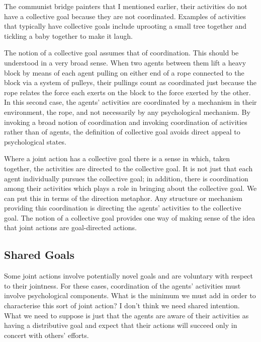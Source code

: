 \documentclass[12pt,a4paper]{extarticle}
\begin{document}
The communist bridge painters that I mentioned earlier, their activities do not have a collective goal because they are not coordinated.
Examples of activities that typically have collective goals include uprooting a small tree together and tickling a baby together to make it laugh.

The notion of a collective goal assumes that of coordination.  This should be understood in a very broad sense.  
When two agents between them lift a heavy block by means of each agent pulling on either end of a rope connected to the block via a system of pulleys, their pullings count as coordinated just because the rope relates the force each exerts on the block to the force exerted by the other.  
In this second case, the agents' activities are coordinated by a mechanism in their environment, the rope, and not necessarily by any psychological mechanism.  
By invoking a broad notion of coordination 
and invoking coordination of activities rather than of agents,
the definition of collective goal avoids direct appeal to psychological states.

Where a joint action has a collective goal there is a sense in which, taken together, the activities are directed to the collective goal.  It is not just that each agent individually pursues the collective goal; in addition, there is coordination among their activities which plays a role in bringing about the collective goal.  We can put this in terms of the direction metaphor.  Any structure or mechanism providing this coordination is directing the agents' activities to the collective goal.  The notion of a collective goal provides one way of making sense of the idea that joint actions are goal-directed actions.

\subsection{Shared Goals}

Some joint actions involve potentially novel goals and are voluntary with respect to their jointness.
For these cases, coordination of the agents' activities must involve psychological components.
What is the minimum we must add in order to characterise this sort of joint action?
I don't think we need shared intention.
What we need to suppose is just that the agents are aware of their activities as having a distributive goal and expect that their actions will succeed only in concert with others' efforts.
\end{document}
